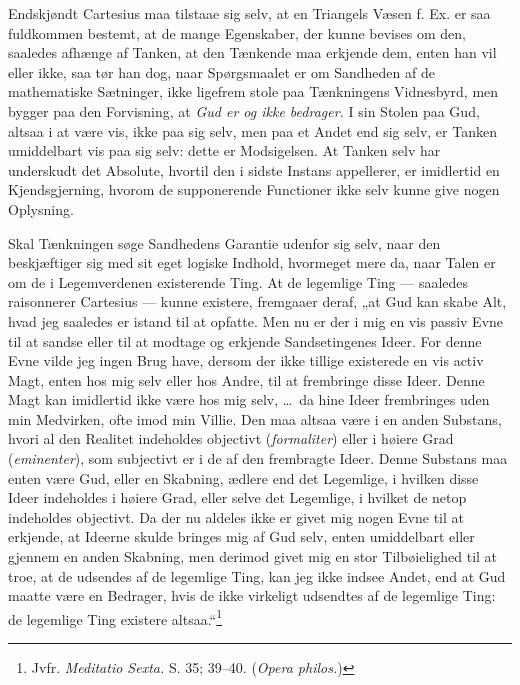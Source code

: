 \documentclass[12pt]{book}
\newcommand{\opage}[1]{\marginnote{\footnotesize\textit{[#1]}}}
\begin{document}
\opage{105}Endskjøndt Cartesius maa tilstaae sig selv, at en Triangels
Væsen f. Ex. er saa fuldkommen bestemt, at de mange
\opage{106}Egenskaber, der kunne bevises om den, saaledes afhænge af
Tanken, at den Tænkende maa erkjende dem, enten han vil
eller ikke, saa tør han dog, naar Spørgsmaalet er om Sandheden
af de mathematiske Sætninger, ikke ligefrem stole paa
Tænkningens Vidnesbyrd, men bygger paa den Forvisning, at
\emph{Gud er og ikke bedrager.} I sin Stolen paa Gud, altsaa
i at være vis, ikke paa sig selv, men paa et Andet end
sig selv, er Tanken umiddelbart vis paa sig selv: dette er
Modsigelsen. At Tanken selv har underskudt det Absolute,
hvortil den i sidste Instans appellerer, er imidlertid en Kjendsgjerning,
hvorom de supponerende Functioner ikke selv kunne
give nogen Oplysning.

Skal Tænkningen søge Sandhedens Garantie udenfor sig
selv, naar den beskjæftiger sig med sit eget logiske Indhold,
hvormeget mere da, naar Talen er om de i Legemverdenen
existerende Ting. At de legemlige Ting --- saaledes raisonnerer
Cartesius --- kunne existere, fremgaaer deraf, „at
Gud kan skabe Alt, hvad jeg saaledes er istand til at opfatte.
Men nu er der i mig en vis passiv Evne til at sandse eller til at
modtage og erkjende Sandsetingenes Ideer. For denne Evne
vilde jeg ingen Brug have, dersom der ikke tillige existerede en vis
activ Magt, enten hos mig selv eller hos Andre, til at frembringe
disse Ideer. Denne Magt kan imidlertid ikke være hos mig
selv, \dots\ da hine Ideer frembringes uden min Medvirken, ofte imod %
min Villie. Den maa altsaa være i en anden Substans,
hvori al den Realitet indeholdes objectivt (\textit{formaliter}) eller i
høiere Grad (\textit{eminenter}), som subjectivt er i de af den frembragte
Ideer. Denne Substans maa enten være Gud, eller
\opage{107}en Skabning, ædlere end det Legemlige, i hvilken disse Ideer
indeholdes i høiere Grad, eller selve det Legemlige, i hvilket
de netop indeholdes objectivt. Da der nu aldeles ikke er givet
mig nogen Evne til at erkjende, at Ideerne skulde bringes
mig af Gud selv, enten umiddelbart eller gjennem en anden
Skabning, men derimod givet mig en stor Tilbøielighed til at
troe, at de udsendes af de legemlige Ting, kan jeg ikke indsee
Andet, end at Gud maatte være en Bedrager, hvis de ikke
virkeligt udsendtes af de legemlige Ting: de legemlige Ting
existere altsaa.“\footnote{Jvfr. \textit{Meditatio Sexta.} S. 35; 39--40. (\textit{Opera philos.})} %
\end{document}
